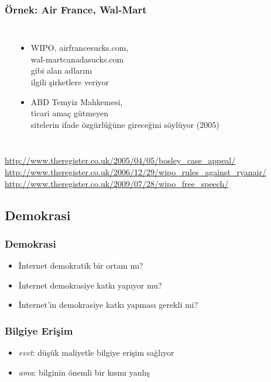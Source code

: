 \documentclass[dvipsnames]{beamer}
\theoremstyle{definition}
\theoremstyle{example}
\theoremstyle{plain}
\begin{document}
\begin{frame}
  \frametitle{Örnek: Air France, Wal-Mart}

  \begin{columns}
    \begin{center}
    \end{center}

    \begin{itemize}
      \item WIPO, airfrancesucks.com,\\
        wal-martcanadasucks.com\\
        gibi alan adlarını\\
        ilgili şirketlere veriyor
      \item ABD Temyiz Mahkemesi,\\
        ticari amaç gütmeyen\\
        sitelerin ifade özgürlüğüne
        gireceğini söylüyor (2005)
    \end{itemize}
  \end{columns}

  \medskip
  \tiny{\url{http://www.theregister.co.uk/2005/04/05/bosley_case_appeal/}}\\
  \tiny{\url{http://www.theregister.co.uk/2006/12/29/wipo_rules_against_ryanair/}}\\
  \tiny{\url{http://www.theregister.co.uk/2009/07/28/wipo_free_speech/}}\\
\end{frame}

\subsection{Demokrasi}

\begin{frame}
  \frametitle{Demokrasi}

  \begin{itemize}
    \item İnternet demokratik bir ortam mı?
    \item İnternet demokrasiye katkı yapıyor mu?
    \item İnternet'in demokrasiye katkı yapması gerekli mi?
  \end{itemize}
\end{frame}

\begin{frame}
  \frametitle{Bilgiye Erişim}

  \begin{itemize}
    \item \emph{evet}: düşük maliyetle bilgiye erişim sağlıyor

    \pause
    \medskip
    \item \emph{ama}: bilginin önemli bir kısmı yanlış
  \end{itemize}
\end{frame}
\end{document}
